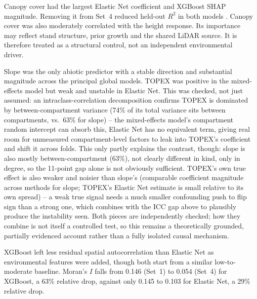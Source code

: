 Canopy cover had the largest Elastic Net coefficient and XGBoost SHAP magnitude. Removing it from
Set~4 reduced held-out $R^2$ in both models . Canopy cover was also moderately correlated with the height response. Its
importance may reflect stand structure, prior growth and the shared LiDAR source. It is therefore
treated as a structural control, not an independent environmental driver.

Slope was the only abiotic predictor with a stable direction and substantial magnitude across the
principal global models. TOPEX was positive in the mixed-effects model but weak and unstable in
Elastic Net. This was checked, not just assumed: an intraclass-correlation decomposition confirms
TOPEX is dominated by between-compartment variance (74\% of its total variance sits between
compartments, vs.\ 63\% for slope) -- the mixed-effects model's compartment random intercept can
absorb this, Elastic Net has no equivalent term, giving real room for unmeasured compartment-level
factors to leak into TOPEX's coefficient and shift it across folds. This only partly explains the
contrast, though: slope is also mostly between-compartment (63\%), not clearly different in kind,
only in degree, so the 11-point gap alone is not obviously sufficient. TOPEX's own true effect is
also weaker and noisier than slope's (comparable coefficient magnitude across methods for slope;
TOPEX's Elastic Net estimate is small relative to its own spread) -- a weak true signal needs a
much smaller confounding push to flip sign than a strong one, which combines with the ICC gap
above to plausibly produce the instability seen. Both pieces are independently checked; how they
combine is not itself a controlled test, so this remains a theoretically grounded, partially
evidenced account rather than a fully isolated causal mechanism.

XGBoost left less residual spatial autocorrelation than Elastic Net as environmental features were
added, though both start from a similar low-to-moderate baseline. Moran's $I$ falls from 0.146
(Set~1) to 0.054 (Set~4) for XGBoost, a 63\% relative drop, against only 0.145 to 0.103 for
Elastic Net, a 29\% relative drop.  

